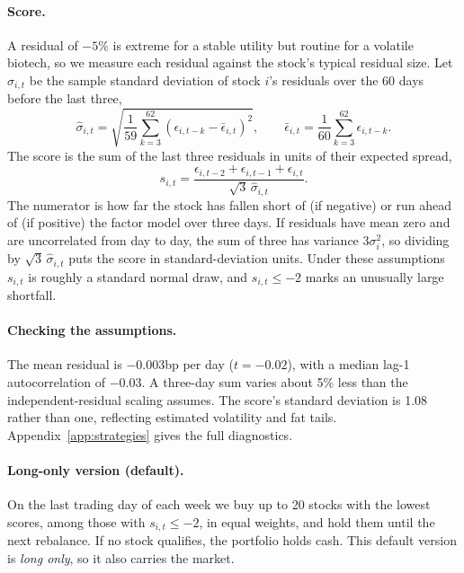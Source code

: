 \documentclass[11pt,letterpaper]{article}
\begin{document}
\paragraph{Score.} A residual of $-5\%$ is extreme for a stable utility but routine for a volatile biotech, so we measure each residual against the stock's typical residual size. Let $\hat\sigma_{i,t}$ be the sample standard deviation of stock $i$'s residuals over the 60 days before the last three,
\[
    \hat\sigma_{i,t} = \sqrt{\frac{1}{59} \sum_{k=3}^{62} \left(\epsilon_{i,t-k} - \bar\epsilon_{i,t}\right)^2},
    \qquad
    \bar\epsilon_{i,t} = \frac{1}{60} \sum_{k=3}^{62} \epsilon_{i,t-k} .
\]
The score is the sum of the last three residuals in units of their expected spread,
\[
    s_{i,t} = \frac{\epsilon_{i,t-2} + \epsilon_{i,t-1} + \epsilon_{i,t}}{\sqrt{3}\, \hat\sigma_{i,t}} .
\]
The numerator is how far the stock has fallen short of (if negative) or run ahead of (if positive) the factor model over three days. If residuals have mean zero and are uncorrelated from day to day, the sum of three has variance $3\sigma_i^2$, so dividing by $\sqrt{3}\,\hat\sigma_{i,t}$ puts the score in standard-deviation units. Under these assumptions $s_{i,t}$ is roughly a standard normal draw, and $s_{i,t} \le -2$ marks an unusually large shortfall.

\paragraph{Checking the assumptions.} The mean residual is $-0.003$bp per day ($t=-0.02$), with a median lag-1 autocorrelation of $-0.03$. A three-day sum varies about 5\% less than the independent-residual scaling assumes. The score's standard deviation is 1.08 rather than one, reflecting estimated volatility and fat tails. Appendix~\ref{app:strategies} gives the full diagnostics.

\paragraph{Long-only version (default).} On the last trading day of each week we buy up to 20 stocks with the lowest scores, among those with $s_{i,t} \le -2$, in equal weights, and hold them until the next rebalance. If no stock qualifies, the portfolio holds cash. This default version is \emph{long only}, so it also carries the market.
\end{document}
